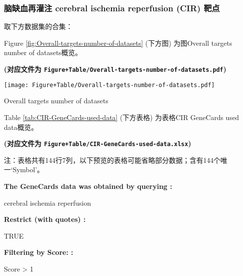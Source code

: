 \documentclass[
]{article}
\begin{document}
\hypertarget{ux8111ux7f3aux8840ux518dux704cux6ce8-cerebral-ischemia-reperfusion-cir-ux9776ux70b9}{%
\subsubsection{脑缺血再灌注 cerebral ischemia reperfusion (CIR) 靶点}\label{ux8111ux7f3aux8840ux518dux704cux6ce8-cerebral-ischemia-reperfusion-cir-ux9776ux70b9}}

取下方数据集的合集：

Figure \ref{fig:Overall-targets-number-of-datasets} (下方图) 为图Overall targets number of datasets概览。

\textbf{(对应文件为 \texttt{Figure+Table/Overall-targets-number-of-datasets.pdf})}

\def\@captype{figure}
\begin{center}
\texttt{[image: Figure+Table/Overall-targets-number-of-datasets.pdf]}
\caption{Overall targets number of datasets}\label{fig:Overall-targets-number-of-datasets}
\end{center}

Table \ref{tab:CIR-GeneCards-used-data} (下方表格) 为表格CIR GeneCards used data概览。

\textbf{(对应文件为 \texttt{Figure+Table/CIR-GeneCards-used-data.xlsx})}

\begin{center}\begin{tcolorbox}[colback=gray!10, colframe=gray!50, width=0.9\linewidth, arc=1mm, boxrule=0.5pt]注：表格共有144行7列，以下预览的表格可能省略部分数据；含有144个唯一`Symbol'。
\end{tcolorbox}
\end{center}\begin{center}\begin{tcolorbox}[colback=gray!10, colframe=gray!50, width=0.9\linewidth, arc=1mm, boxrule=0.5pt]
\textbf{
The GeneCards data was obtained by querying
:}

\vspace{0.5em}

    cerebral ischemia reperfusion

\vspace{2em}


\textbf{
Restrict (with quotes)
:}

\vspace{0.5em}

    TRUE

\vspace{2em}


\textbf{
Filtering by Score:
:}

\vspace{0.5em}

    Score > 1

\vspace{2em}
\end{tcolorbox}
\end{center}
\end{document}
